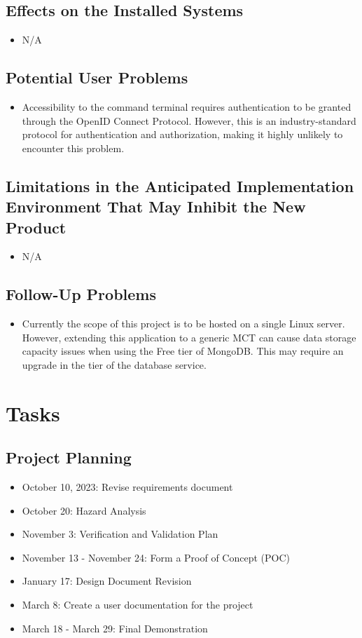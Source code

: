 \documentclass[12pt]{article}
\begin{document}
\subsection{Effects on the Installed Systems}
\begin{itemize}
    \item N/A
\end{itemize}

\subsection{Potential User Problems}
\begin{itemize}
    \item Accessibility to the command terminal requires authentication to be granted through the OpenID Connect Protocol. However, this is an industry-standard protocol for authentication and authorization, making it highly unlikely to encounter this problem.
\end{itemize}

\subsection{Limitations in the Anticipated Implementation Environment That May
Inhibit the New Product}
\begin{itemize}
    \item N/A
\end{itemize}

\subsection{Follow-Up Problems}
\begin{itemize}
    \item Currently the scope of this project is to be hosted on a single Linux server. However, extending this application to a generic MCT can cause data storage capacity issues when using the Free tier of MongoDB. This may require an upgrade in the tier of the database service.
\end{itemize}

\section{Tasks}
\subsection{Project Planning}
\begin{itemize}
    \item October 10, 2023: Revise requirements document
    \item October 20: Hazard Analysis
    \item November 3: Verification and Validation Plan
    \item November 13 - November 24: Form a Proof of Concept (POC)
    \item January 17: Design Document Revision
    \item March 8: Create a user documentation for the project
    \item March 18 - March 29: Final Demonstration 
\end{itemize}
\end{document}
